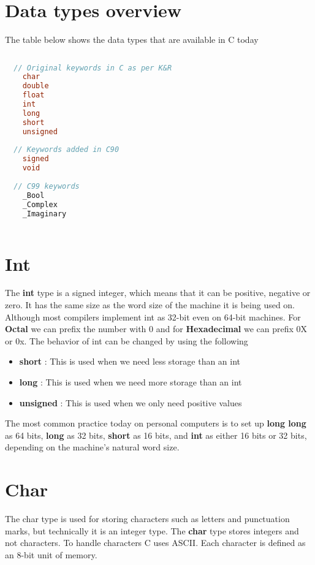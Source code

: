 \documentclass[11pt,a4paper,oneside]{book}
\begin{document}
\section{Data types overview}
The table below shows the data types that are available in C today
\begin{lstlisting}[title=C data keywords, language=C]
  
  // Original keywords in C as per K&R
    char
    double
    float
    int
    long
    short
    unsigned
  
  // Keywords added in C90
    signed
    void
  
  // C99 keywords
    _Bool
    _Complex
    _Imaginary
  
\end{lstlisting}

\section{Int}
The \textbf{int} type is a signed integer, which means that it can be
positive, negative or zero. It has the same size as the word size of the
machine it is being used on. Although most compilers implement int as 32-bit
even on 64-bit machines. For \textbf{Octal} we can prefix the number with 0
and for \textbf{Hexadecimal} we can prefix 0X or 0x. The behavior of int can
be changed by using the following

\begin{itemize}
\itemsep-3pt
\item \textbf{short} : This is used when we need less storage than an int
\item \textbf{long} : This is used when we need more storage than an int
\item \textbf{unsigned} : This is used when we only need positive values
\end{itemize}

\noindent The most common practice today on personal computers is to set up
\textbf{long long} as 64 bits, \textbf{long} as 32 bits, \textbf{short} as 16 bits,
and \textbf{int} as either 16 bits or 32 bits, depending on the machine's natural
word size.

\section{Char}
The char type is used for storing characters such as letters and punctuation marks,
but technically it is an integer type. The \textbf{char} type stores integers and 
not characters. To handle characters C uses ASCII. Each character is defined as an
8-bit unit of memory.\\
\end{document}
